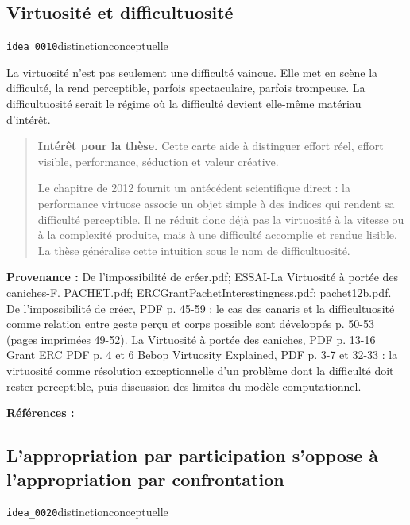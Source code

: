 \documentclass[10pt,a4paper]{article}
\begin{document}
\subsection{Virtuosité et difficultuosité}
{\small\color{metadata} \texttt{idea\_0010}\quad\textbullet\quad distinction\quad\textbullet\quad conceptuelle\par}

La virtuosité n'est pas seulement une difficulté vaincue. Elle met en scène la difficulté, la rend perceptible, parfois spectaculaire, parfois trompeuse. La difficultuosité serait le régime où la difficulté devient elle-même matériau d'intérêt.

\begin{quote}
\textbf{Intérêt pour la thèse.} Cette carte aide à distinguer effort réel, effort visible, performance, séduction et valeur créative.

Le chapitre de 2012 fournit un antécédent scientifique direct : la performance virtuose associe un objet simple à des indices qui rendent sa difficulté perceptible. Il ne réduit donc déjà pas la virtuosité à la vitesse ou à la complexité produite, mais à une difficulté accomplie et rendue lisible. La thèse généralise cette intuition sous le nom de difficultuosité.
\end{quote}
{\footnotesize\color{metadata}\textbf{Provenance :} De l'impossibilité de créer.pdf; ESSAI-La Virtuosité à portée des caniches-F. PACHET.pdf; ERCGrantPachetInterestingness.pdf; pachet12b.pdf. De l'impossibilité de créer, PDF p. 45-59 ; le cas des canaris et la difficultuosité comme relation entre geste perçu et corps possible sont développés p. 50-53 (pages imprimées 49-52). La Virtuosité à portée des caniches, PDF p. 13-16 Grant ERC PDF p. 4 et 6 Bebop Virtuosity Explained, PDF p. 3-7 et 32-33 : la virtuosité comme résolution exceptionnelle d'un problème dont la difficulté doit rester perceptible, puis discussion des limites du modèle computationnel.\par}
{\footnotesize\color{metadata}\textbf{Références :} \parencite{pachet2026impossibilite,pachet2027virtuosite,pachet2012virtuosity}\par}

\subsection{L'appropriation par participation s'oppose à l'appropriation par confrontation}
{\small\color{metadata} \texttt{idea\_0020}\quad\textbullet\quad distinction\quad\textbullet\quad conceptuelle\par}
\end{document}
